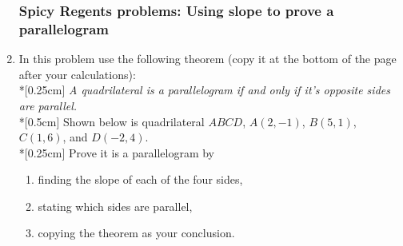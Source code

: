 \documentclass[12pt, twoside]{article}
\begin{document}
\begin{enumerate}
  \subsubsection*{Spicy Regents problems: Using slope to prove a parallelogram}
    \item In this problem use the following theorem (copy it at the bottom of the page after your calculations): \\*[0.25cm]
    \emph{A quadrilateral is a parallelogram if and only if it's opposite sides are parallel.}\\*[0.5cm]
    Shown below is quadrilateral $ABCD$, $A(2,-1)$, $B(5,1)$, $C(1,6)$, and $D(-2,4)$. \\*[0.25cm]
    Prove it is a parallelogram by
    \begin{enumerate}
      \item finding the slope of each of the four sides,
      \item stating which sides are parallel,
      \item copying the theorem as your conclusion.
    \end{enumerate}
    \begin{flushright} %
    \end{flushright}
  
\newpage

\end{enumerate}
\end{document}
